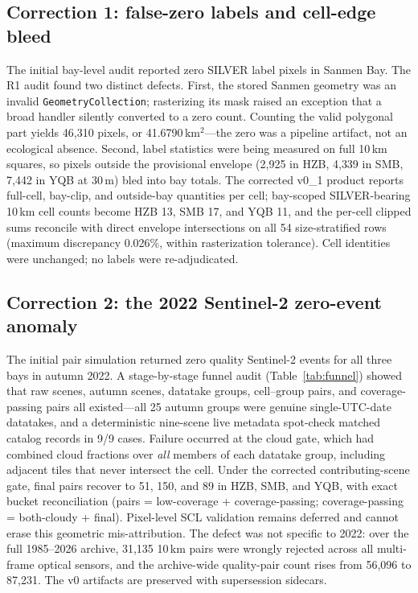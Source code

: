 \subsection{Correction 1: false-zero labels and cell-edge bleed}
The initial bay-level audit reported zero SILVER label pixels in Sanmen
Bay. The R1 audit found two distinct defects. First, the stored Sanmen
geometry was an invalid \texttt{GeometryCollection}; rasterizing its
mask raised an exception that a broad handler silently converted to a
zero count. Counting the valid polygonal part yields 46{,}310 pixels,
or 41.6790\,km$^2$---the zero was a pipeline artifact, not an ecological
absence. Second, label statistics were being measured on full 10\,km
squares, so pixels outside the provisional envelope (2{,}925 in HZB,
4{,}339 in SMB, 7{,}442 in YQB at 30\,m) bled into bay totals. The
corrected v0\_1 product reports full-cell, bay-clip, and
outside-bay quantities per cell; bay-scoped SILVER-bearing 10\,km cell
counts become HZB 13, SMB 17, and YQB 11, and the per-cell clipped sums
reconcile with direct envelope intersections on all 54 size-stratified
rows (maximum discrepancy 0.026\%, within rasterization tolerance).
Cell identities were unchanged; no labels were re-adjudicated.

\begin{figure}[t]\centering
{}
\label{fig:zhejiang}
\end{figure}

\subsection{Correction 2: the 2022 Sentinel-2 zero-event anomaly}
The initial pair simulation returned zero quality Sentinel-2 events for
all three bays in autumn 2022. A stage-by-stage funnel audit
(Table~\ref{tab:funnel}) showed that raw scenes, autumn scenes,
datatake groups, cell--group pairs, and coverage-passing pairs all
existed---all 25 autumn groups were genuine single-UTC-date datatakes,
and a deterministic nine-scene live metadata spot-check matched catalog
records in 9/9 cases. Failure occurred at the cloud gate, which had
combined cloud fractions over \emph{all} members of each datatake
group, including adjacent tiles that never intersect the cell. Under
the corrected contributing-scene gate, final pairs recover to 51, 150,
and 89 in HZB, SMB, and YQB, with exact bucket reconciliation
(pairs = low-coverage + coverage-passing; coverage-passing =
both-cloudy + final). Pixel-level SCL validation remains deferred and
cannot erase this geometric mis-attribution. The defect was not
specific to 2022: over the full 1985--2026 archive, 31{,}135 10\,km
pairs were wrongly rejected across all multi-frame optical sensors, and
the archive-wide quality-pair count rises from 56{,}096 to 87{,}231.
The v0 artifacts are preserved with supersession sidecars.


